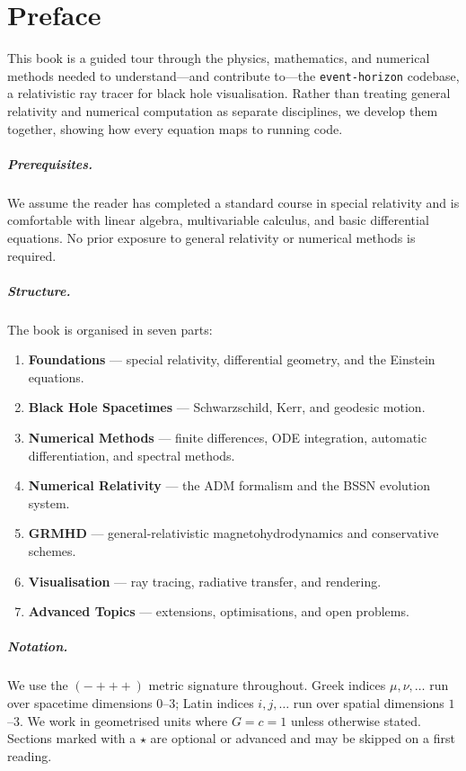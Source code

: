 \chapter*{Preface}

This book is a guided tour through the physics, mathematics, and numerical
methods needed to understand---and contribute to---the \texttt{event-horizon}
codebase, a relativistic ray tracer for black hole visualisation. Rather than
treating general relativity and numerical computation as separate disciplines,
we develop them together, showing how every equation maps to running code.

\paragraph{Prerequisites.}
We assume the reader has completed a standard course in special relativity and
is comfortable with linear algebra, multivariable calculus, and basic
differential equations. No prior exposure to general relativity or numerical
methods is required.

\paragraph{Structure.}
The book is organised in seven parts:
\begin{enumerate}
  \item \textbf{Foundations} --- special relativity, differential geometry, and
        the Einstein equations.
  \item \textbf{Black Hole Spacetimes} --- Schwarzschild, Kerr, and geodesic
        motion.
  \item \textbf{Numerical Methods} --- finite differences, ODE integration,
        automatic differentiation, and spectral methods.
  \item \textbf{Numerical Relativity} --- the ADM formalism and the BSSN
        evolution system.
  \item \textbf{GRMHD} --- general-relativistic magnetohydrodynamics and
        conservative schemes.
  \item \textbf{Visualisation} --- ray tracing, radiative transfer, and
        rendering.
  \item \textbf{Advanced Topics} --- extensions, optimisations, and open
        problems.
\end{enumerate}

\paragraph{Notation.}
We use the $({-}{+}{+}{+})$ metric signature throughout. Greek indices
$\mu,\nu,\ldots$ run over spacetime dimensions $0$--$3$; Latin indices
$i,j,\ldots$ run over spatial dimensions $1$--$3$. We work in geometrised
units where $G = c = 1$ unless otherwise stated. Sections marked with a
$\star$ are optional or advanced and may be skipped on a first reading.
